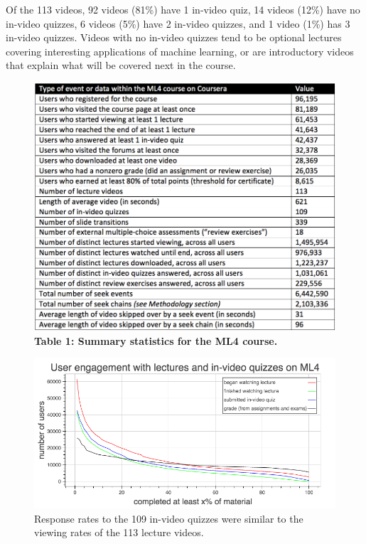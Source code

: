 \documentclass{sigchi}
\begin{document}
Of the 113 videos, 92 videos (81\%) have 1 in-video quiz, 14 videos (12\%) have no in-video quizzes, 6 videos (5\%) have 2 in-video quizzes, and 1 video (1\%) has 3 in-video quizzes. Videos with no in-video quizzes tend to be optional lectures covering interesting applications of machine learning, or are introductory videos that explain what will be covered next in the course. %

\begin{figure}
\includegraphics[width=1.0\columnwidth]{summary-statistics}
\small{\textbf{Table 1: Summary statistics for the ML4 course.}}
\label{fig:summary-statistics}
\end{figure}

\begin{figure}
\includegraphics[width=1.0\columnwidth]{user-engagement-with-material}
\caption{Response rates to the 109 in-video quizzes were similar to the viewing rates of the 113 lecture videos.}
\label{fig:user-engagement-with-material}
\end{figure}
\end{document}
